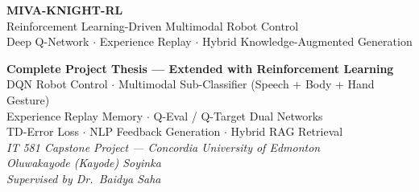 \documentclass[12pt,a4paper]{article}
\theoremstyle{definition}
\theoremstyle{plain}
\theoremstyle{remark}
\begin{document}
\begin{titlepage}

\vspace*{3cm}
{\color{white}\fontsize{30}{36}\selectfont\bfseries\hspace{1.2cm}MIVA-KNIGHT-RL}\\[0.4cm]
{\color{white!85}\fontsize{17}{21}\selectfont\hspace{1.2cm}Reinforcement Learning-Driven Multimodal Robot Control}\\[0.15cm]
{\color{white!75}\fontsize{14}{18}\selectfont\hspace{1.2cm}Deep Q-Network $\cdot$ Experience Replay $\cdot$ Hybrid Knowledge-Augmented Generation}

\vspace{1.5cm}
\begin{center}
\begin{tcolorbox}[width=0.90\textwidth,colback=white,colframe=NavyBlue,arc=6pt,boxrule=1.5pt]
\centering
\textbf{Complete Project Thesis — Extended with Reinforcement Learning}\\[6pt]
DQN Robot Control $\cdot$ Multimodal Sub-Classifier (Speech + Body + Hand Gesture)\\
Experience Replay Memory $\cdot$ Q-Eval / Q-Target Dual Networks\\
TD-Error Loss $\cdot$ NLP Feedback Generation $\cdot$ Hybrid RAG Retrieval\\[8pt]
\small\textit{IT 581 Capstone Project — Concordia University of Edmonton}\\
\textit{Oluwakayode (Kayode) Soyinka}\\[4pt]
\textit{Supervised by Dr.\ Baidya Saha}
\end{tcolorbox}
\end{center}


\end{titlepage}
\end{document}

